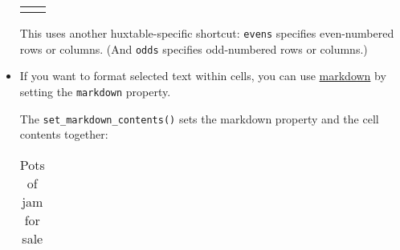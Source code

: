 \documentclass[]{article}
\newenvironment{Shaded}{\begin{snugshade}}{\end{snugshade}}
\newcommand{\DecValTok}[1]{\textcolor[rgb]{0.00,0.00,0.81}{#1}}
\newcommand{\KeywordTok}[1]{\textcolor[rgb]{0.13,0.29,0.53}{\textbf{#1}}}
\newcommand{\NormalTok}[1]{#1}
\newcommand{\OperatorTok}[1]{\textcolor[rgb]{0.81,0.36,0.00}{\textbf{#1}}}
\newcommand{\StringTok}[1]{\textcolor[rgb]{0.31,0.60,0.02}{#1}}
\begin{document}
\begin{itemize}
\begin{table}[ht]
\begin{centerbox}
\begin{threeparttable}
\begin{tabularx}{0.4\textwidth}{p{} p{}}
  \hhline{}
  \arrayrulecolor{black}
  \end{tabularx}
  \end{threeparttable}\par\end{centerbox}

  \end{table}

  \FloatBarrier

  This uses another huxtable-specific shortcut: \texttt{evens} specifies
  even-numbered rows or columns. (And \texttt{odds} specifies
  odd-numbered rows or columns.)
\item
  If you want to format selected text within cells, you can use
  \href{https://commonmark.org/help}{markdown} by setting the
  \texttt{markdown} property.

  The \texttt{set\_markdown\_contents()} sets the markdown property and
  the cell contents together:

\begin{Shaded}
\end{Shaded}


    \providecommand{\huxb}[2]{\arrayrulecolor[RGB]{#1}\global\arrayrulewidth=#2pt}
    \providecommand{\huxvb}[2]{\color[RGB]{#1}\vrule width #2pt}
    \providecommand{\huxtpad}[1]{\rule{0pt}{#1}}
    \providecommand{\huxbpad}[1]{\rule[-#1]{0pt}{#1}}

  \begin{table}[ht]
  \begin{centerbox}
  \begin{threeparttable}
  \captionsetup{justification=centering,singlelinecheck=off}
  \caption{Pots of jam for sale}
   \setlength{\tabcolsep}{0pt}
  \begin{tabularx}{0.4\textwidth}{p{} p{}}



\end{tabularx}
\end{threeparttable}
\end{centerbox}
\end{table}
\end{itemize}
\end{document}
